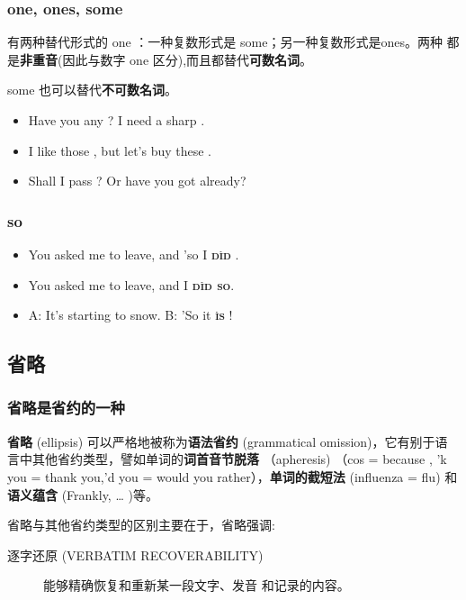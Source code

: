 \subsubsection{one, ones, some}

有两种替代形式的 one ：一种复数形式是 some；另一种复数形式是ones。两种
都是\textbf{非重音}(因此与数字 one 区分),而且都替代\textbf{可数名词}。

some 也可以替代\textbf{不可数名词}。
\begin{itemize}
\item Have you any ? I need a sharp .
\item I like those , but let's buy these .

\item Shall I pass ? Or have you got  already?
\end{itemize}


\subsubsection{so}
\begin{itemize}
\item You asked me to leave, and 'so I  \textbf{\textsc{d\`id}} .
\item You asked me to leave, and  I \textbf{\textsc{d\`id so}}.
\item A: It's starting to snow. B: 'So it \textbf{\textsc{\`is}} !
\end{itemize}

\subsection{省略}

\subsubsection{省略是省约的一种}

\textbf{省略} (ellipsis) 可以严格地被称为\textbf{语法省约} (grammatical omission)，它有别于语
言中其他省约类型，譬如单词的\textbf{词首音节脱落} （apheresis) （cos = because , 'k
you = thank you,'d you = would you rather），\textbf{单词的截短法} (influenza = flu)
和\textbf{语义蕴含} (Frankly, \ldots{} )等。

省略与其他省约类型的区别主要在于，省略强调:
\begin{description}
\item[逐字还原 (VERBATIM RECOVERABILITY)] 能够精确恢复和重新某一段文字、发音
  和记录的内容。
\end{description}

